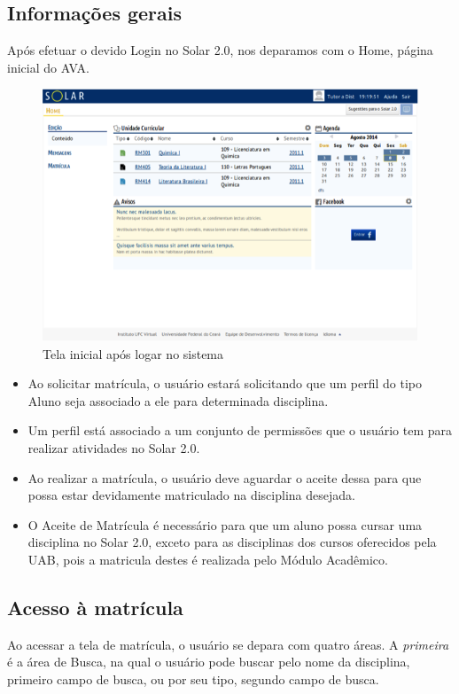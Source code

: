 \documentclass[letterpaper,10pt,english]{sphinxmanual}
\begin{document}
\subsection{Informações gerais}
\label{enrollment:informacoes-gerais}\label{enrollment:enrollment-info}
Após efetuar o devido Login no Solar 2.0, nos deparamos com o Home, página inicial do AVA.
\begin{figure}[htbp]
\centering
\capstart

\includegraphics{enrollment-info.png}
\caption{Tela inicial após logar no sistema}\end{figure}
\begin{itemize}
\item {} 
Ao solicitar matrícula, o usuário estará solicitando que um perfil do tipo Aluno seja associado a ele para determinada disciplina.

\item {} 
Um perfil está associado a um conjunto de permissões que o usuário tem para realizar atividades no Solar 2.0.

\item {} 
Ao realizar a matrícula, o usuário deve aguardar o aceite dessa para que possa estar devidamente matriculado na disciplina desejada.

\item {} 
O Aceite de Matrícula é necessário para que um aluno possa cursar uma disciplina no Solar 2.0, exceto para as disciplinas dos cursos oferecidos pela UAB, pois a matricula destes é realizada pelo Módulo Acadêmico.

\end{itemize}


\subsection{Acesso à matrícula}
\label{enrollment:acesso-a-matricula}\label{enrollment:enrollment-access}
Ao acessar a tela de matrícula, o usuário se depara com quatro áreas. A \emph{primeira} é a área de Busca, na qual o usuário pode buscar pelo nome da disciplina, primeiro campo de busca, ou por seu tipo, segundo campo de busca.
\end{document}
